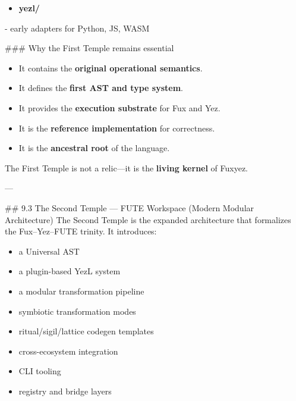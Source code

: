 \begin{enumerate}
\begin{itemize}
  \item \textbf{yezl/}  
\end{itemize}
  - early adapters for Python, JS, WASM  

\#\#\# Why the First Temple remains essential  
\begin{itemize}
  \item It contains the \textbf{original operational semantics}.  
  \item It defines the \textbf{first AST and type system}.  
  \item It provides the \textbf{execution substrate} for Fux and Yez.  
  \item It is the \textbf{reference implementation} for correctness.  
  \item It is the \textbf{ancestral root} of the language.  
\end{itemize}

The First Temple is not a relic—it is the \textbf{living kernel} of Fuxyez.

---

\#\# 9.3 The Second Temple — FUTE Workspace (Modern Modular Architecture)  
The Second Temple is the expanded architecture that formalizes the Fux–Yez–FUTE trinity. It introduces:

\begin{itemize}
  \item a Universal AST  
  \item a plugin-based YezL system  
  \item a modular transformation pipeline  
  \item symbiotic transformation modes  
  \item ritual/sigil/lattice codegen templates  
  \item cross-ecosystem integration  
  \item CLI tooling  
  \item registry and bridge layers  
\end{itemize}


\end{enumerate}
